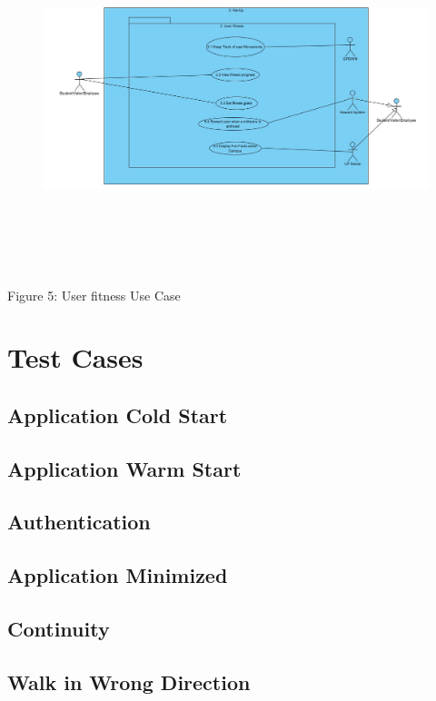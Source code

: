 \documentclass{article}
\begin{document}
\begin{center}
\begin{itemize}
			\begin{figure}[H]\includegraphics[width = \textwidth, height = 10cm]{User_fitness.JPG} \end{figure}
			Figure 5: User fitness Use Case

	\end{itemize}
	\end{center}
			\section{Test Cases}
			\subsection{Application Cold Start} %
			\subsection{Application Warm Start} %
			\subsection {Authentication} %
			\subsection{Application Minimized} %
			\subsection{Continuity} %
			\subsection{Walk in Wrong Direction} %
\end{document}
